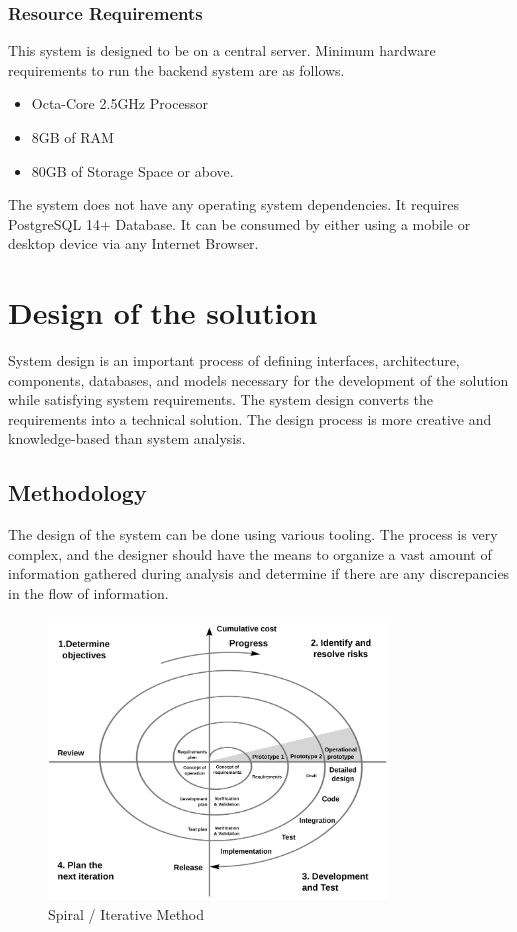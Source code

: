 \documentclass[12pt,a4paper]{report}
\begin{document}
\subsection{Resource Requirements}
This system is designed to be on a central server. Minimum hardware requirements to run the backend system are as follows.
\begin{itemize}
\item Octa-Core 2.5GHz Processor
\item 8GB of RAM
\item 80GB of Storage Space or above. 
\end{itemize}
The system does not have any operating system dependencies. It requires PostgreSQL 14+ Database. It can be consumed by either using a mobile or desktop device via any Internet Browser. 
 
\chapter{Design of the solution}

System design is an important process of defining interfaces, architecture, components, databases, and models necessary for the development of the solution while satisfying system requirements. The system design converts the requirements into a technical solution. The design process is more creative and knowledge-based than system analysis. 

\section{Methodology}

The design of the system can be done using various tooling. The process is very complex, and the designer should have the means to organize a vast amount of information gathered during analysis and determine if there are any discrepancies in the flow of information. 

\begin{figure}[h]
\begin{center}
\includegraphics[width=0.8\textwidth]{images/spiral.png}	
\end{center}
\caption{Spiral / Iterative Method}
\label{fig:spiral}
\end{figure}
\end{document}
